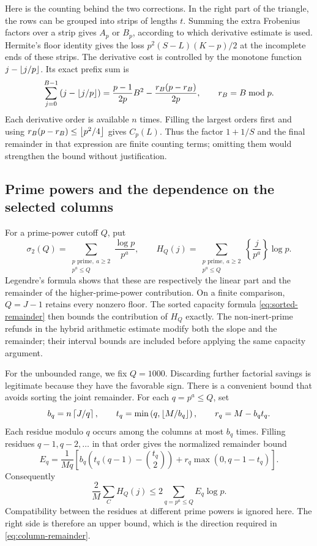 Here is the counting behind the two corrections. In the right part of the triangle, the rows can be grouped into strips of lengths $t$. Summing the extra Frobenius factors over a strip gives $A_p$ or $B_p$, according to which derivative estimate is used. Hermite's floor identity gives the loss $p^2(S-L)(K-p)/2$ at the incomplete ends of these strips. The derivative cost is controlled by the monotone function $j-\left\lfloor j/p\right\rfloor$. Its exact prefix sum is
\begin{equation}\label{eq:small-column-prefix}
 \sum_{j=0}^{B-1}\left(j-\left\lfloor j/p\right\rfloor\right)
 =\frac{p-1}{2p}B^2-\frac{r_B(p-r_B)}{2p},
 \qquad r_B=B\bmod p.
\end{equation}
Each derivative order is available $n$ times. Filling the largest orders first and using $r_B(p-r_B)\leq\left\lfloor p^2/4\right\rfloor$ gives $C_p(L)$. Thus the factor $1+1/S$ and the final remainder in that expression are finite counting terms; omitting them would strengthen the bound without justification.

\subsection{Prime powers and the dependence on the selected columns}
For a prime-power cutoff $Q$, put
\[
 \sigma_2(Q)=\sum_{\substack{p\text{ prime},\ a\geq2\\p^a\leq Q}}
                       \frac{\log p}{p^a},\qquad
 H_Q(j)=\sum_{\substack{p\text{ prime},\ a\geq2\\p^a\leq Q}}
                      \left\{\frac j{p^a}\right\}\log p.
\]
Legendre's formula shows that these are respectively the linear part and the remainder of the higher-prime-power contribution. On a finite comparison, $Q=J-1$ retains every nonzero floor. The sorted capacity formula \eqref{eq:sorted-remainder} then bounds the contribution of $H_Q$ exactly. The non-inert-prime refunds in the hybrid arithmetic estimate modify both the slope and the remainder; their interval bounds are included before applying the same capacity argument.

For the unbounded range, we fix $Q=1000$. Discarding further factorial savings is legitimate because they have the favorable sign. There is a convenient bound that avoids sorting the joint remainder. For each $q=p^a\leq Q$, set
\[
 b_q=n\left\lceil J/q\right\rceil,\qquad
 t_q=\min\left(q,\left\lfloor M/b_q\right\rfloor\right),\qquad r_q=M-b_qt_q.
\]
Each residue modulo $q$ occurs among the columns at most $b_q$ times. Filling residues $q-1,q-2,\ldots$ in that order gives the normalized remainder bound
\[
 E_q=\frac1{Mq}\left[b_q\left(t_q(q-1)-\binom{t_q}{2}\right)
                    +r_q\max(0,q-1-t_q)\right].
\]
Consequently
\begin{equation}\label{eq:power-capacity}
 \frac2M\sum_C H_Q(j)\leq2\sum_{q=p^a\leq Q}E_q\log p.
\end{equation}
Compatibility between the residues at different prime powers is ignored here. The right side is therefore an upper bound, which is the direction required in \eqref{eq:column-remainder}.

